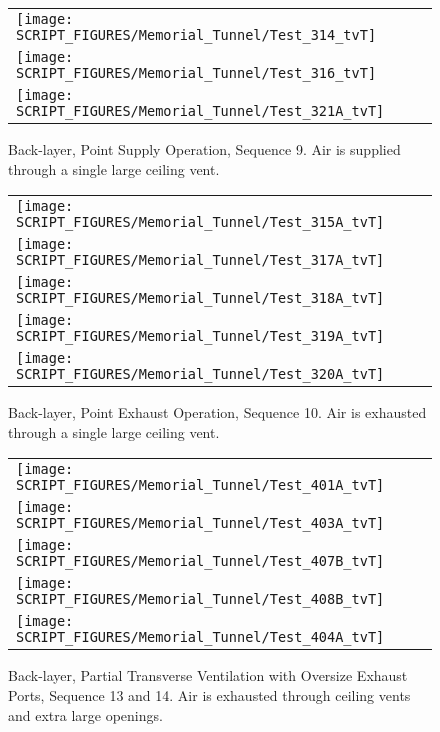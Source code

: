 \begin{figure}[p]
\begin{tabular*}{\textwidth}{l}
\texttt{[image: SCRIPT\_FIGURES/Memorial\_Tunnel/Test\_314\_tvT]} \\
\texttt{[image: SCRIPT\_FIGURES/Memorial\_Tunnel/Test\_316\_tvT]} \\
\texttt{[image: SCRIPT\_FIGURES/Memorial\_Tunnel/Test\_321A\_tvT]}
\end{tabular*}
\caption[Back-layer, Point Supply Operation, Sequence 9]{Back-layer, Point Supply Operation, Sequence 9. Air is supplied through a single large ceiling vent.}
\label{Memorial_Tunnel_Seq_9}
\end{figure}

\begin{figure}[p]
\begin{tabular*}{\textwidth}{l}
\texttt{[image: SCRIPT\_FIGURES/Memorial\_Tunnel/Test\_315A\_tvT]} \\
\texttt{[image: SCRIPT\_FIGURES/Memorial\_Tunnel/Test\_317A\_tvT]} \\
\texttt{[image: SCRIPT\_FIGURES/Memorial\_Tunnel/Test\_318A\_tvT]} \\
\texttt{[image: SCRIPT\_FIGURES/Memorial\_Tunnel/Test\_319A\_tvT]} \\
\texttt{[image: SCRIPT\_FIGURES/Memorial\_Tunnel/Test\_320A\_tvT]}
\end{tabular*}
\caption[Back-layer, Point Exhaust Operation, Sequence 10]{Back-layer, Point Exhaust Operation, Sequence 10. Air is exhausted through a single large ceiling vent.}
\label{Memorial_Tunnel_Seq_10}
\end{figure}

\begin{figure}[p]
\begin{tabular*}{\textwidth}{l}
\texttt{[image: SCRIPT\_FIGURES/Memorial\_Tunnel/Test\_401A\_tvT]} \\
\texttt{[image: SCRIPT\_FIGURES/Memorial\_Tunnel/Test\_403A\_tvT]} \\
\texttt{[image: SCRIPT\_FIGURES/Memorial\_Tunnel/Test\_407B\_tvT]} \\
\texttt{[image: SCRIPT\_FIGURES/Memorial\_Tunnel/Test\_408B\_tvT]} \\
\texttt{[image: SCRIPT\_FIGURES/Memorial\_Tunnel/Test\_404A\_tvT]}
\end{tabular*}
\caption[Back-layer, Partial Transverse Ventilation with Oversize Exhaust Ports, Sequence 13 and 14]{Back-layer, Partial Transverse Ventilation with Oversize Exhaust Ports, Sequence 13 and 14. Air is exhausted through ceiling vents and extra large openings.}
\label{Memorial_Tunnel_Seq_13_and_14}
\end{figure}


